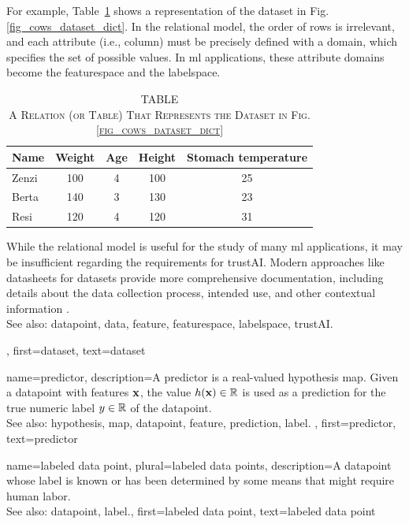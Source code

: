 {{		For example, Table~\ref{tab:cowdata_dict} shows a representation of the dataset in Fig. \ref{fig_cows_dataset_dict}. 
		In the relational \gls{model}, the order of rows is irrelevant, and each attribute (i.e., column) must be 
		precisely defined with a domain, which specifies the set of possible values. In \gls{ml} applications, 
		these attribute domains become the \gls{featurespace} and the \gls{labelspace}.
		\begin{table}[H]
			\caption*{
				\centering 
				\scshape TABLE \thetable \\[0.5ex]
				\scshape A Relation (or Table) That Represents the Dataset in Fig. \ref{fig_cows_dataset_dict} 
			}
			\label{tab:cowdata_dict} 
			\centering
			\begin{tabular}{lcccc}
				\hline
				\textbf{Name} & \textbf{Weight} & \textbf{Age} & \textbf{Height} & \textbf{Stomach temperature} \\
				\hline
				Zenzi & 100 & 4 & 100 & 25 \\
				Berta & 140 & 3 & 130 & 23 \\
				Resi  & 120 & 4 & 120 & 31 \\
				\hline
			\end{tabular}
		\end{table}
 		While the relational \gls{model} is useful for the study of many \gls{ml} applications, it may be 
 		insufficient regarding the requirements for \gls{trustAI}. Modern 
 		approaches like datasheets for datasets provide more comprehensive 
 		documentation, including details about the \gls{data} collection process, intended 
 		use, and other contextual information \cite{DatasheetData2021}.
 		\\
		See also: \gls{datapoint}, \gls{data}, \gls{feature}, \gls{featurespace}, \gls{labelspace}, \gls{trustAI}.},
	first={dataset},
	text={dataset}  
}

{name={predictor},
	description={A predictor is a real-valued \gls{hypothesis} \gls{map}. 
		Given a \gls{datapoint} with \glspl{feature} ${\bf x}$, the value 
		$h({\bf x}) \in \mathbb{R}$ is used as a \gls{prediction} for the true 
		numeric \gls{label} $y \in \mathbb{R}$ of the \gls{datapoint}.
				\\
		See also: \gls{hypothesis}, \gls{map}, \gls{datapoint}, \gls{feature}, \gls{prediction}, \gls{label}. },
	first={predictor},
	text={predictor}  
}

{name={labeled data point}, plural={labeled data points},
 	description={A \gls{datapoint} whose \gls{label} is known or has been determined 
 		by some means that might require human labor.
			\\
		See also: \gls{datapoint}, \gls{label}.},
 	first={labeled data point},
 	text={labeled data point}  
}

